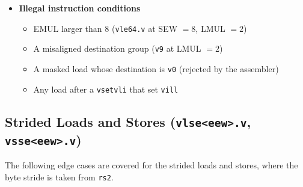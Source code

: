 \documentclass[11pt,a4paper]{article}
\begin{document}
\begin{itemize}
    \item \textbf{Illegal instruction conditions}
    \begin{itemize}
        \item EMUL larger than 8 (\texttt{vle64.v} at SEW $= 8$, LMUL $= 2$)
        \item A misaligned destination group (\texttt{v9} at LMUL $= 2$)
        \item A masked load whose destination is \texttt{v0} (rejected by the assembler)
        \item Any load after a \texttt{vsetvli} that set \texttt{vill}
    \end{itemize}
\end{itemize}

\subsection*{Strided Loads and Stores (\texttt{vlse<eew>.v}, \texttt{vsse<eew>.v})}
\label{subsec:ldst-strided}

The following edge cases are covered for the strided loads and stores, where the byte stride
is taken from \texttt{rs2}.
\end{document}
